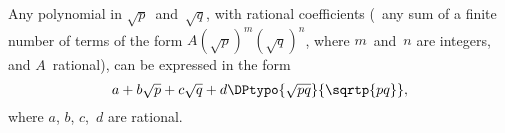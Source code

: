 Any polynomial in $\sqrt{p}$~and~$\sqrt{q}$, with rational coefficients (\ie\ any
sum of a finite number of terms of the form $A(\sqrt{p})^{m}(\sqrt{q})^{n}$, where $m$~and~$n$
are integers, and $A$~rational), can be expressed in the form
\[
a + b\sqrt{p} + c\sqrt{q} + d\DPtypo{\sqrt{pq}}{\sqrtp{pq}},
\]
where $a$, $b$, $c$,~$d$ are rational.

